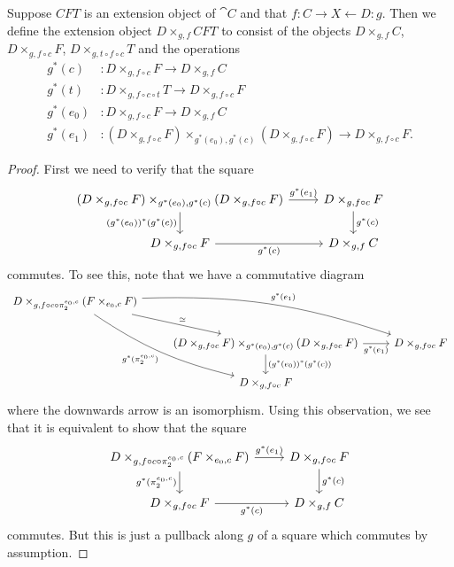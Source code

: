 \begin{defn}
Suppose $CFT$ is an extension object of $\cat{C}$ and that $f:C\rightarrow X\leftarrow D:g$.
Then we define the extension object $D\times_{g,f} CFT$ to consist of the objects $D\times_{g,f} C$,
$D\times_{g,f\circ c} F$, $D\times_{g,t\circ f\circ c} T$ and the operations
\begin{align*}
g^\ast(c) & : D\times_{g,f\circ c} F\to D\times_{g,f} C\\
g^\ast(t) & : D\times_{g,f\circ c\circ t} T\to D\times_{g,f\circ c} F\\
g^\ast(e_0) & : D\times_{g,f\circ c} F\to D\times_{g,f} C\\
g^\ast(e_1) & : (D\times_{g,f\circ c} F) \times_{g^\ast(e_0),g^\ast(c)} (D\times_{g,f\circ c} F)\to D\times_{g,f\circ c} F.
\end{align*}
\end{defn}

\begin{proof}
First we need to verify that the square
\begin{equation*}
\begin{tikzcd}
(D\times_{g,f\circ c} F) \times_{g^\ast(e_0),g^\ast(c)} (D\times_{g,f\circ c} F)
  \ar{r}{g^\ast(e_1)} 
  \ar{d}[swap]{(g^\ast(e_0))^\ast(g^\ast(c))} 
  & 
D\times_{g,f\circ c} F
  \ar{d}{g^\ast(c)}
  \\
D\times_{g,f\circ c} F
  \ar{r}[swap]{g^\ast(c)} 
  & 
D\times_{g,f} C
\end{tikzcd}
\end{equation*}
commutes. To see this, note that we have a commutative diagram
\begin{equation*}
\begin{tikzcd}
D\times_{g,f\circ c\circ \pi_2^{e_0,c}}(F\times_{e_0,c} F)  
  \ar[bend right=10]{ddr}[swap]{g^\ast(\pi_2^{e_0,c})}
  \ar[bend left=10]{drr}{g^\ast(e_1)}
  \ar{dr}{\simeq}
  \\
  {}
  &
(D\times_{g,f\circ c} F)\times_{g^\ast(e_0),g^\ast(c)}(D\times_{g,f\circ c} F)
  \ar{r}[swap]{g^\ast(e_1)}
  \ar{d}{(g^\ast(e_0))^\ast(g^\ast(c))}
  &
  D\times_{g,f\circ c} F
  \\
  {}
  &
D\times_{g,f\circ c} F
  &
{}
\end{tikzcd}
\end{equation*}
where the downwards arrow is an isomorphism. Using this observation, we see that
it is equivalent to show that the square
\begin{equation*}
\begin{tikzcd}
D\times_{g,f\circ c\circ \pi_2^{e_0,c}}(F\times_{e_0,c} F)
  \ar{r}{g^\ast(e_1)} 
  \ar{d}[swap]{g^\ast(\pi_2^{e_0,c})} 
  & 
D\times_{g,f\circ c} F
  \ar{d}{g^\ast(c)}
  \\
D\times_{g,f\circ c} F
  \ar{r}[swap]{g^\ast(c)} 
  & 
D\times_{g,f} C
\end{tikzcd}
\end{equation*}
commutes. But this is just a pullback along $g$ of a square which commutes by assumption.
\end{proof}

